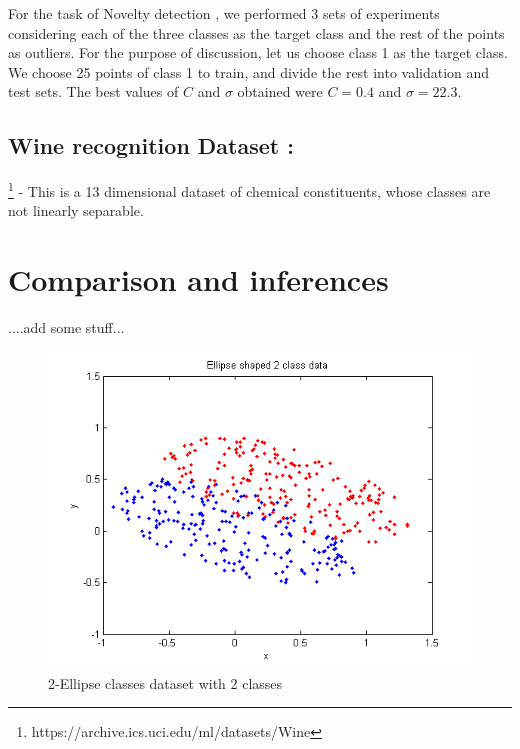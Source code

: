 \documentclass{article} %
\begin{document}
For the task of Novelty detection , we performed 3 sets of experiments considering each of the three classes as the target class and the rest of the points as outliers. For the purpose of discussion, let us choose class 1 as the target class. We choose 25 points of class 1 to train, and divide the rest into validation and test sets. The best values of $C$ and $\sigma$ obtained were $C = 0.4$ and $\sigma = 22.3$. 


\subsection{Wine recognition Dataset :}\footnote{https://archive.ics.uci.edu/ml/datasets/Wine}  - This is a 13 dimensional dataset of chemical constituents, whose classes are not linearly separable. 


\section{Comparison and inferences}
....add some stuff...

\begin{figure}
  \centering
  \includegraphics[width=\linewidth]{../Code/Ellipse/svdd/data}
  \caption{2-Ellipse classes dataset with 2 classes}
\end{figure}
\end{document}
